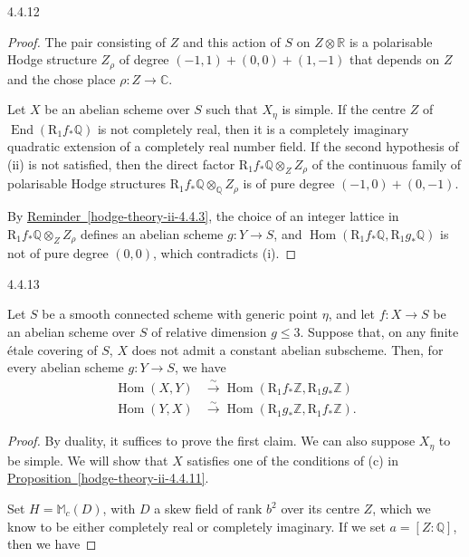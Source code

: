 \begin{proposition}{4.4.12}
\begin{proof}
      The pair consisting of \(Z\) and this action of \(S\) on \(Z\otimes \mathbb {R}\) is a polarisable Hodge structure \(Z_\rho \) of degree \((-1,1)+(0,0)+(1,-1)\) that depends on \(Z\) and the chose place \(\rho \colon  Z\to \mathbb {C}\).\par{}Let \(X\) be an abelian scheme over \(S\) such that \(X_\eta \) is simple.
      If the centre \(Z\) of \(\operatorname {End}(\mathrm {R}_1f_*\mathbb {Q})\) is not completely real, then it is a completely imaginary quadratic extension of a completely real number field.
      If the second hypothesis of (ii) is not satisfied, then the direct factor \(\mathrm {R}_1f_*\mathbb {Q}\otimes _Z Z_\rho \) of the continuous family of polarisable Hodge structures \(\mathrm {R}_1f_*\mathbb {Q}\otimes _\mathbb {Q} Z_\rho \) is of pure degree \((-1,0)+(0,-1)\).\par{}By \hyperref[hodge-theory-ii-4.4.3]{Reminder~\ref*{hodge-theory-ii-4.4.3}}, the choice of an integer lattice in \(\mathrm {R}_1f_*\mathbb {Q}\otimes _Z Z_\rho \) defines an abelian scheme \(g\colon  Y\to  S\), and \(\operatorname {Hom}(\mathrm {R}_1f_*\mathbb {Q},\mathrm {R}_1g_*\mathbb {Q})\) is not of pure degree \((0,0)\), which contradicts (i).\end{proof}\end{proposition}\begin{corollary}{4.4.13}\label{hodge-theory-ii-4.4.13}\skipsinglepar\par{}Let \(S\) be a smooth connected scheme with generic point \(\eta \), and let \(f\colon  X\to  S\) be an abelian scheme over \(S\) of relative dimension \(g\leqslant 3\).
    Suppose that, on any finite étale covering of \(S\), \(X\) does not admit a constant abelian subscheme.
    Then, for every abelian scheme \(g\colon  Y\to  S\), we have
    \[       \begin {aligned}         \operatorname {Hom}(X,Y)         &\xrightarrow {\sim } \operatorname {Hom}(\mathrm {R}_1f_*\mathbb {Z},\mathrm {R}_1g_*\mathbb {Z})       \\\operatorname {Hom}(Y,X)         &\xrightarrow {\sim } \operatorname {Hom}(\mathrm {R}_1g_*\mathbb {Z},\mathrm {R}_1f_*\mathbb {Z}).       \end {aligned}     \]\begin{proof}\par{}By duality, it suffices to prove the first claim.
      We can also suppose \(X_\eta \) to be simple.
      We will show that \(X\) satisfies one of the conditions of (c) in \hyperref[hodge-theory-ii-4.4.11]{Proposition~\ref*{hodge-theory-ii-4.4.11}}.\par{}Set \(H=\mathbb {M}_c(D)\), with \(D\) a skew field of rank \(b^2\) over its centre \(Z\), which we know to be either completely real or completely imaginary.
      If we set \(a=[Z:\mathbb {Q}]\), then we have


\end{proof}
\end{corollary}
